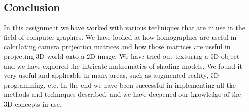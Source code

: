 \subsection{Conclusion}

In this assignment we have worked with various techniques that are in use in the field of computer graphics. We have looked at how homographies are useful in calculating camera projection matrices and how those matrices are useful in projecting 3D world onto a 2D image. We have tried out texturing a 3D object and we have explored the intricate mathematics of shading models. We found it very useful and applicable in many areas, such as augmented reality, 3D programming, etc. In the end we have been successful in implementing all the methods and techniques described, and we have deepened our knowledge of the 3D concepts in use.


